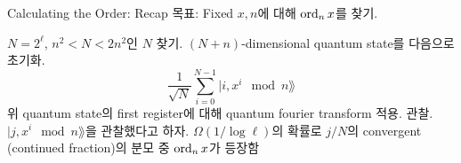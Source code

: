 \documentclass[../240513_msquare_shor.tex]{subfiles}
\begin{document}
\begin{frame}{Calculating the Order: Recap}
    목표: Fixed \(x, n\)에 대해 \(\operatorname{ord}_n x\)를 찾기.
    \begin{enumerate}
        \ii
        \(N = 2^\ell\), \(n^2 < N < 2n^2\)인 \(N\) 찾기.
        \ii
        \alert{
            \((N + n)\)-dimensional quantum state를 다음으로 초기화.
            \[
                \frac{1}{\sqrt{N}} \sum_{i=0}^{N-1} | i, x^i \mod n \rang
            \]
        }
        \ii
        위 quantum state의 first register에 대해 quantum fourier transform 적용.
        \ii
        관찰. \(| j, x^i \mod n \rang\)을 관찰했다고 하자.
        \ii
        \(\Omega(1/\log \ell)\)의 확률로 \(j/N\)의 convergent (continued fraction)의 분모 중
        \(\operatorname{ord}_n x\)가 등장함
    \end{enumerate}
\end{frame}
\end{document}
